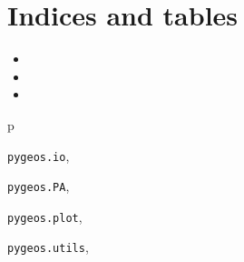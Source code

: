 \documentclass[letterpaper,10pt,english]{sphinxmanual}
\begin{document}
\chapter{Indices and tables}
\label{index:indices-and-tables}\begin{itemize}
\item {} 

\item {} 

\item {} 

\end{itemize}


\renewcommand{\indexname}{Python Module Index}
\begin{theindex}
\def\bigletter#1{{\Large\sffamily#1}\nopagebreak\vspace{1mm}}
\bigletter{p}
\item {\texttt{pygeos.io}}, \pageref{index:module-pygeos.io}
\item {\texttt{pygeos.PA}}, \pageref{index:module-pygeos.PA}
\item {\texttt{pygeos.plot}}, \pageref{index:module-pygeos.plot}
\item {\texttt{pygeos.utils}}, \pageref{index:module-pygeos.utils}
\end{theindex}

\renewcommand{\indexname}{Index}
\printindex
\end{document}
